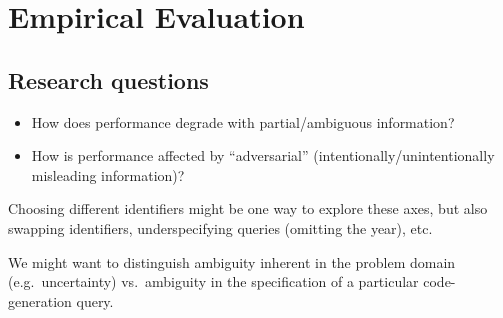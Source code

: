 \section{Empirical Evaluation}
\label{sec:evaluation}

\subsection{Research questions}

\begin{itemize}
\item How does performance degrade with partial/ambiguous information?
\item How is performance affected by ``adversarial'' (intentionally/unintentionally misleading information)?
\end{itemize}

Choosing different identifiers might be one way to explore these axes, but also swapping identifiers,
underspecifying queries (omitting the year), etc.

We might want to distinguish ambiguity inherent in the problem domain (e.g.~uncertainty) vs.~ambiguity in the
specification of a particular code-generation query.
